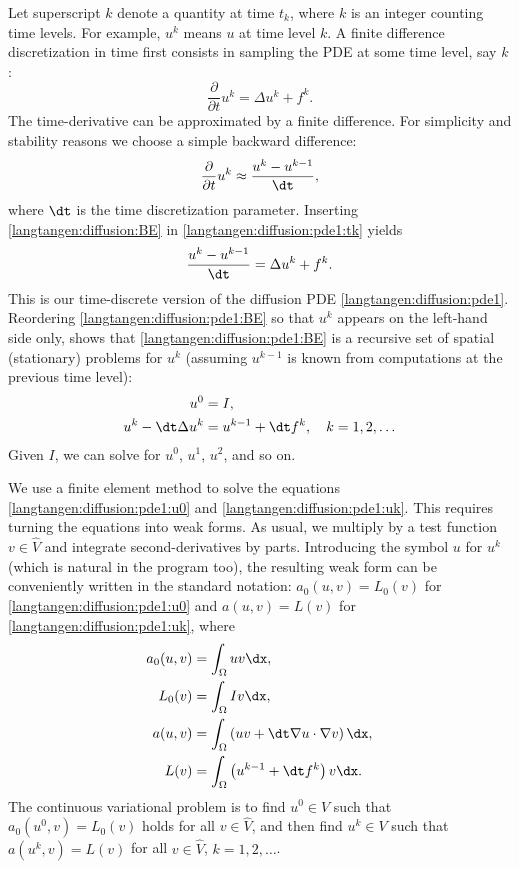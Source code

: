 Let superscript $k$ denote a quantity at time $t_k$, where $k$ is an
integer counting time levels. For example, $u^k$ means $u$ at time
level $k$.  A finite difference discretization in time first consists
in sampling the PDE at some time level, say $k$:
\begin{equation}
  \frac{\partial}{\partial t}u^k = \Delta u^k + f^k.
\label{langtangen:diffusion:pde1:tk}
\end{equation}
The time-derivative can be approximated by a finite difference.
For simplicity and stability reasons we choose a
simple backward difference:
\begin{equation}
  \frac{\partial}{\partial t} u^k\approx \frac{u^k - u^{k-1}}{\dt},
\label{langtangen:diffusion:BE}
\end{equation}
where ${\dt}$ is the time discretization parameter.
Inserting \eqref{langtangen:diffusion:BE} in \eqref{langtangen:diffusion:pde1:tk}
yields
\begin{equation}
  \frac{u^k - u^{k-1}}{\dt} = \Delta u^k + f^k.
\label{langtangen:diffusion:pde1:BE}
\end{equation}
This is our time-discrete version of the diffusion PDE \eqref{langtangen:diffusion:pde1}.
Reordering \eqref{langtangen:diffusion:pde1:BE} so that $u^k$ appears
on the left-hand side only, shows that \eqref{langtangen:diffusion:pde1:BE}
is a recursive set of
spatial (stationary) problems for $u^k$ (assuming $u^{k-1}$ is known from
computations at the previous time level):
\begin{align}
u^0 &= I,
\label{langtangen:diffusion:pde1:u0}
\\
u^k - {\dt}\Delta u^k &=  u^{k-1} + {\dt} f^k, \quad k=1,2,\ldots
\label{langtangen:diffusion:pde1:uk}
\end{align}
Given $I$, we can solve for $u^0$, $u^1$, $u^2$, and so on.

We use a finite element method to solve the
equations \eqref{langtangen:diffusion:pde1:u0} and
\eqref{langtangen:diffusion:pde1:uk}.  This requires turning the equations
into weak forms.  As usual, we multiply by a test function $v\in \hat V$
and integrate second-derivatives by parts. Introducing the symbol $u$
for $u^k$ (which is natural in the program too), the resulting weak form
can be conveniently written in the standard notation: $a_0(u,v)=L_0(v)$
for \eqref{langtangen:diffusion:pde1:u0} and $a(u,v)=L(v)$ for
\eqref{langtangen:diffusion:pde1:uk}, where
\begin{align}
a_0(u,v) &= \int_\Omega uv\dx,
\label{langtangen:diffusion:pde1:a0}
\\
L_0(v) &= \int_\Omega Iv\dx,
\label{langtangen:diffusion:pde1:L0}
\\
a(u,v) &= \int_\Omega\left( uv + {\dt} \nabla u\cdot \nabla v\right)\dx,
\label{langtangen:diffusion:pde1:a}
\\
L(v) &= \int_\Omega \left(u^{k-1} + {\dt}  f^k\right)v\dx.
\label{langtangen:diffusion:pde1:L}
\end{align}
The continuous variational problem is to find $u^0\in V$ such that
$a_0(u^0,v)=L_0(v)$ holds for all $v\in\hat V$, and then find $u^k\in V$
such that $a(u^k,v)=L(v)$ for all $v\in\hat V$, $k=1,2,\ldots$.

